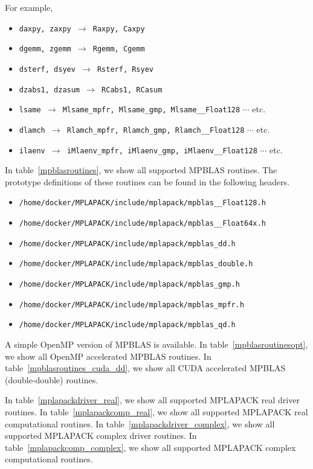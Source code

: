 \documentclass[12pt]{article}
\begin{document}
For example, \begin{itemize}
    \item {\tt daxpy, zaxpy $\rightarrow$ Raxpy, Caxpy}
    \item {\tt dgemm, zgemm $\rightarrow$ Rgemm, Cgemm}
    \item {\tt dsterf, dsyev $\rightarrow$ Rsterf, Rsyev}
    \item {\tt dzabs1, dzasum $\rightarrow$ RCabs1, RCasum}
    \item {\tt lsame $\rightarrow$ Mlsame\_mpfr,  Mlsame\_gmp, Mlsame\_\_Float128} $\cdots$ etc.
    \item {\tt dlamch $\rightarrow$ Rlamch\_mpfr,  Rlamch\_gmp, Rlamch\_\_Float128} $\cdots$ etc.
    \item {\tt ilaenv $\rightarrow$ iMlaenv\_mpfr,  iMlaenv\_gmp, iMlaenv\_\_Float128} $\cdots$ etc.
\end{itemize}

In table~\ref{mpblasroutines}, we show all supported MPBLAS routines.
The prototype definitions of these routines can be found in the following headers.
\begin{itemize}
\item {\tt /home/docker/MPLAPACK/include/mplapack/mpblas\_\_Float128.h}
\item {\tt /home/docker/MPLAPACK/include/mplapack/mpblas\_\_Float64x.h}
\item {\tt /home/docker/MPLAPACK/include/mplapack/mpblas\_dd.h}
\item {\tt /home/docker/MPLAPACK/include/mplapack/mpblas\_double.h}
\item {\tt /home/docker/MPLAPACK/include/mplapack/mpblas\_gmp.h}
\item {\tt /home/docker/MPLAPACK/include/mplapack/mpblas\_mpfr.h}
\item {\tt /home/docker/MPLAPACK/include/mplapack/mpblas\_qd.h}
\end{itemize}
A simple OpenMP version of MPBLAS is available.
In table~\ref{mpblasroutinesopt}, we show all OpenMP accelerated MPBLAS routines.
In table~\ref{mpblasroutines_cuda_dd}, we show all CUDA accelerated MPBLAS (double-double) routines.

In table~\ref{mplapackdriver_real}, we show all supported MPLAPACK real driver routines.
In table~\ref{mplapackcomp_real}, we show all supported MPLAPACK real computational routines.
In table~\ref{mplapackdriver_complex}, we show all supported MPLAPACK complex driver routines.
In table~\ref{mplapackcomp_complex}, we show all supported MPLAPACK complex computational routines.
\end{document}

